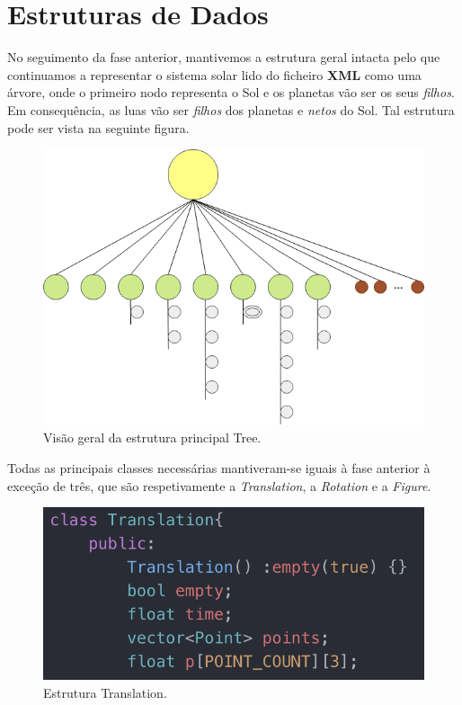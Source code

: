 \documentclass[a4paper]{article}
\begin{document}
\newpage

\section{Estruturas de Dados}
\label{sec:estruturasdados}

No seguimento da fase anterior, mantivemos a estrutura geral intacta pelo que continuamos a representar o sistema solar lido do ficheiro \textbf{XML} como uma árvore, onde o primeiro nodo representa o Sol e os planetas vão ser os seus \textit{filhos}. Em consequência, as luas vão ser \textit{filhos} dos planetas e \textit{netos} do Sol. Tal estrutura pode ser vista na seguinte figura.

\begin{figure}[H]
\centering
\includegraphics[scale=0.6]{tree_struct.png}
\caption{Visão geral da estrutura principal Tree.}
\label{img:tree_struct}
\end{figure}

Todas as principais classes necessárias mantiveram-se iguais à fase anterior à exceção de três, que são respetivamente a \textit{Translation}, a \textit{Rotation} e a \textit{Figure}.

\begin{figure}[H]
\centering
\includegraphics[scale=0.75]{translation.png}
\caption{Estrutura Translation.}
\label{img:translation}
\end{figure}
\end{document}
